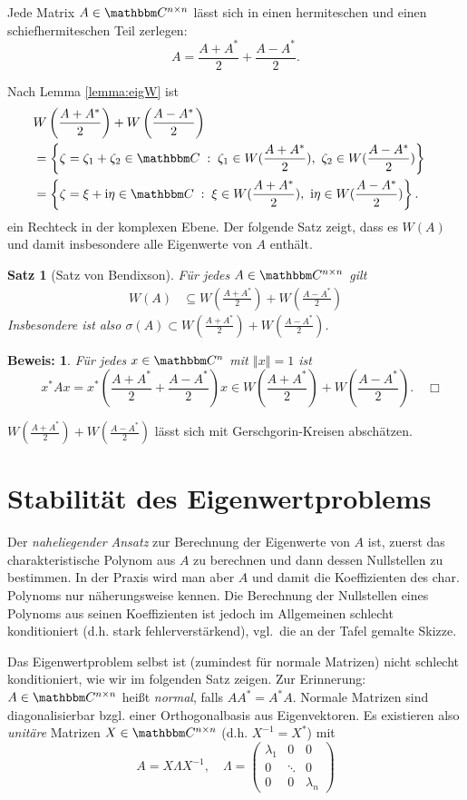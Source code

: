\documentclass[12pt,a4paper]{book}
\theoremstyle{break}
\newtheorem{theorem}{Satz}[chapter]
\theoremstyle{nonumberplain}
\newtheorem{beweis}{Beweis:}
\newcommand{\C}{\mathbbm C}
\newcommand{\norm}[1]{\left\Vert#1\right\Vert}		%
\newcommand{\1}{\mathbbm{1}} 			      	%
\newcommand{\im}{\ensuremath{\mathrm{i}}} 			      	%
\newcommand{\dd}{\; : \;}    			      	%
\begin{document}
Jede Matrix $A\in \C^{n\times n}$ lässt sich in einen hermiteschen und einen schiefhermiteschen Teil zerlegen:
\[
A=\frac{A+A^*}{2}+\frac{A-A^*}{2}.
\]

Nach Lemma \ref{lemma:eigW} ist
\begin{align*}
\lefteqn{W \left(\frac{A+A^*}{2}\right)+W\left(\frac{A-A^*}{2}\right)}\\
&=\left\{ \zeta=\zeta_1+\zeta_2\in \C \dd \zeta_1\in W(\frac{A+A^*}{2}),\ \zeta_2\in W(\frac{A-A^*}{2}) \right\}\\
&=\left\{ \zeta=\xi + \im \eta\in \C \dd \xi \in W(\frac{A+A^*}{2}),\ \im \eta \in W(\frac{A-A^*}{2}) \right\}.\\
\end{align*}
ein Rechteck in der komplexen Ebene. Der folgende Satz zeigt, dass es $W(A)$ und damit insbesondere alle Eigenwerte von $A$ enthält.

\begin{theorem}[Satz von Bendixson]
Für jedes $A\in \C^{n\times n}$ gilt
\begin{align*}
W(A)& \subseteq W(\frac{A+A^*}{2})+W(\frac{A-A^*}{2})
\end{align*}
Insbesondere ist also $\sigma(A)\subset  W(\frac{A+A^*}{2})+W(\frac{A-A^*}{2})$.
\end{theorem}
\begin{beweis}
Für jedes $x\in \C^n$ mit $\norm{x}=1$ ist
\[
\quad x^* A x=x^* \left( \frac{A+A^*}{2}+\frac{A-A^*}{2}\right) x\in W(\frac{A+A^*}{2})+W(\frac{A-A^*}{2}). \quad \Box
\]
\end{beweis}

$W(\frac{A+A^*}{2})+W(\frac{A-A^*}{2})$ lässt sich mit Gerschgorin-Kreisen abschätzen.




\section{Stabilität des Eigenwertproblems}

Der \emph{naheliegender Ansatz} zur Berechnung der Eigenwerte von $A$ ist, zuerst das charakteristische Polynom aus $A$ zu berechnen und dann dessen Nullstellen zu bestimmen. In der Praxis wird man aber $A$ und damit die Koeffizienten des char. Polynoms nur näherungsweise kennen. Die Berechnung der Nullstellen eines Polynoms aus seinen Koeffizienten ist jedoch im Allgemeinen schlecht konditioniert (d.h. stark fehlerverstärkend), vgl.\ die an der Tafel gemalte Skizze.

Das Eigenwertproblem selbst ist (zumindest für normale Matrizen) nicht schlecht konditioniert, wie wir im folgenden Satz zeigen.
Zur Erinnerung: $A\in \C^{n\times n}$ heißt \emph{normal}, falls $AA^*=A^*A$. Normale Matrizen sind diagonalisierbar bzgl. einer Orthogonalbasis
aus Eigenvektoren. Es existieren also \emph{unitäre} Matrizen $X\in \C^{n\times n}$ (d.h. $X^{-1}=X^*$) mit 
\[
A=X \Lambda X^{-1}, \quad \Lambda=\begin{pmatrix} \lambda_1 & 0 & 0\\ 0 & \ddots & 0\\ 0 & 0 & \lambda_n\end{pmatrix}
\]
\end{document}
